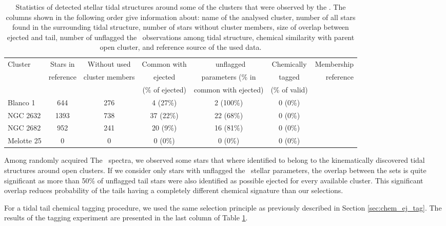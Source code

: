 \begin{table}
	\centering
	\caption{ Statistics of detected stellar tidal structures around some of the clusters that were observed by the \Gh. The columns shown in the following order give information about: name of the analysed cluster, number of all stars found in the surrounding tidal structure, number of stars without cluster members, size of overlap between ejected and tail, number of unflagged the \Gh\ observations among tidal structure, chemical similarity with parent open cluster, and reference source of the used data.}
	\begin{tabular}{l | c | c | c | c | c | r }
		\hline
		Cluster & Stars in & Without used & Common with & \Gh\ unflagged & Chemically & Membership\\
		& reference & cluster members & ejected & parameters (\% in & tagged & reference\\
		&  &  & (\% of ejected) & common with ejected) & (\% of valid) & \\
		\hline
		Blanco 1     & 644 & 276 & 4 (27\%) & 2 (100\%) & 0 (0\%) & \citet{2019arXiv191206657Z} \\
		NGC 2632  & 1393 & 738 & 37 (22\%) & 22 (68\%) & 0 (0\%) & \citet{2019AA...627A...4R} \\
		NGC 2682     & 952 & 241 & 20 (9\%) & 16 (81\%) & 0 (0\%) & \citet{2019AA...627A.119C} \\
		Melotte 25   & 0 & 0 & 0 (0\%) & 0 (0\%) & 0 (0\%) & \citet{2019AA...621L...3M} \\
		\hline
	\end{tabular}
	\label{tab:cluster_stats_tails}
\end{table}

Among randomly acquired The \Gh\ spectra, we observed some stars that where identified to belong to the kinematically discovered tidal structures around open clusters. If we consider only stars with unflagged the \Gh\ stellar parameters, the overlap between the sets is quite significant as more than 50\% of unflagged tail stars were also identified as possible ejected for every available cluster. This significant overlap reduces probability of the tails having a completely different chemical signature than our selections. 

For a tidal tail chemical tagging procedure, we used the same selection principle as previously described in Section \ref{sec:chem_ej_tag}. The results of the tagging experiment are presented in the last column of Table \ref{tab:cluster_stats_tails}. 


